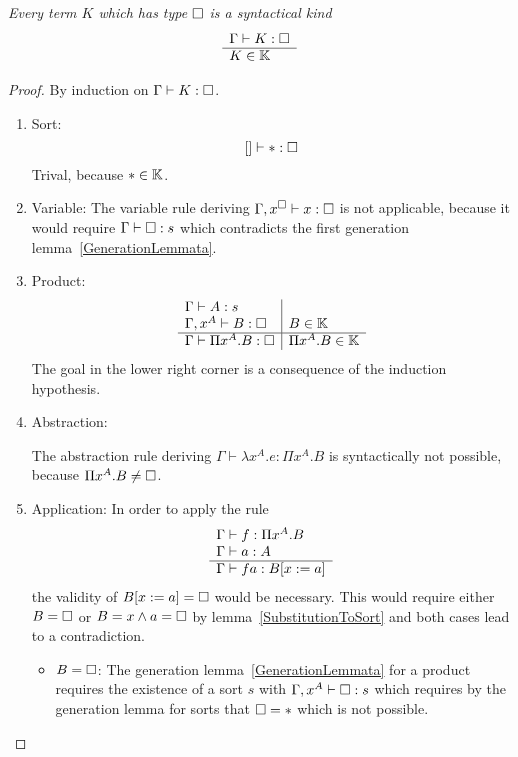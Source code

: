\begin{theorem}
    \label{TypeAnyImpliesKind}
    \emph{Every term $K$ which has type $\Box$ is a syntactical kind}
    $$
    \begin{array}{l} 
        \Gamma \vdash K: \Box
     \\ \hline 
        K \in \mathbb{K}
    \end{array}
    $$

    \begin{proof}
        By induction on $\Gamma \vdash K: \Box$.

        \begin{enumerate}
        \item Sort:
            $$
            [] \vdash *: \Box
            $$
            Trival, because $* \in \mathbb{K}$.

        \item Variable: The variable rule deriving $\Gamma, x^\Box \vdash x:
            \Box$ is not applicable, because it would require $\Gamma \vdash
                \Box : s$ which contradicts the first generation
                lemma~\ref{GenerationLemmata}.

        \item Product:
            $$
            \begin{array}{l|l}
                \Gamma \vdash A: s
                \\
                \Gamma, x^A \vdash B: \Box
                &
                B \in \mathbb{K}
                \\
                \hline
                \Gamma \vdash \Pi x^A. B : \Box
                &
                \Pi x^A . B \in \mathbb{K}
            \end{array}
            $$
            The goal in the lower right corner is a consequence of the induction
                hypothesis.

        \item Abstraction:

            The abstraction rule deriving $\Gamma \vdash \lambda x^A. e : \Pi
                x^A. B$ is syntactically not possible, because $\Pi x^A.B \ne
                \Box$.

        \item Application:
            In order to apply the rule
            $$
            \begin{array}{l} 
                \Gamma\vdash f: \Pi x^A. B
                \\
                \Gamma \vdash a: A
             \\ \hline 
                \Gamma \vdash f a : B[x:=a]
            \end{array}
            $$
            the validity of $B[x:=a] = \Box$ would be necessary. This would
                require either $B = \Box$ or $B = x \land a = \Box$ by
                lemma~\ref{SubstitutionToSort} and both cases lead to a
                contradiction.
            \begin{itemize}
            \item $B = \Box$: The generation lemma~\ref{GenerationLemmata} for a
                product requires the existence of a sort $s$ with $\Gamma, x^A
                    \vdash \Box : s$ which requires by the generation lemma for
                    sorts that $\Box = *$ which is not possible.


\end{itemize}
\end{enumerate}
\end{proof}
\end{theorem}
